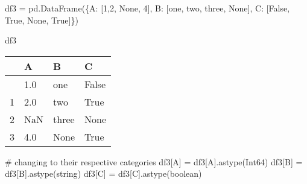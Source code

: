 \documentclass[
  letterpaper,
  DIV=11,
  numbers=noendperiod]{scrreprt}
\newenvironment{Shaded}{\begin{snugshade}}{\end{snugshade}}
\newcommand{\CommentTok}[1]{\textcolor[rgb]{0.37,0.37,0.37}{#1}}
\newcommand{\DecValTok}[1]{\textcolor[rgb]{0.68,0.00,0.00}{#1}}
\newcommand{\NormalTok}[1]{\textcolor[rgb]{0.00,0.23,0.31}{#1}}
\newcommand{\OperatorTok}[1]{\textcolor[rgb]{0.37,0.37,0.37}{#1}}
\newcommand{\StringTok}[1]{\textcolor[rgb]{0.13,0.47,0.30}{#1}}
\newcommand{\VariableTok}[1]{\textcolor[rgb]{0.07,0.07,0.07}{#1}}
\begin{document}
\begin{Shaded}
\begin{Highlighting}[]
\NormalTok{df3 }\OperatorTok{=}\NormalTok{ pd.DataFrame(\{}\StringTok{\textquotesingle{}A\textquotesingle{}}\NormalTok{: [}\DecValTok{1}\NormalTok{,}\DecValTok{2}\NormalTok{, }\VariableTok{None}\NormalTok{, }\DecValTok{4}\NormalTok{],}
                   \StringTok{\textquotesingle{}B\textquotesingle{}}\NormalTok{: [}\StringTok{\textquotesingle{}one\textquotesingle{}}\NormalTok{, }\StringTok{\textquotesingle{}two\textquotesingle{}}\NormalTok{, }\StringTok{\textquotesingle{}three\textquotesingle{}}\NormalTok{, }\VariableTok{None}\NormalTok{],}
                   \StringTok{\textquotesingle{}C\textquotesingle{}}\NormalTok{: [}\VariableTok{False}\NormalTok{, }\VariableTok{True}\NormalTok{, }\VariableTok{None}\NormalTok{, }\VariableTok{True}\NormalTok{]\})}

\NormalTok{df3}
\end{Highlighting}
\end{Shaded}

\begin{longtable}[]{@{}llll@{}}
\toprule\noalign{}
& A & B & C \\
\midrule\noalign{}
\endhead
\bottomrule\noalign{}
\endlastfoot
0 & 1.0 & one & False \\
1 & 2.0 & two & True \\
2 & NaN & three & None \\
3 & 4.0 & None & True \\
\end{longtable}

\begin{Shaded}
\begin{Highlighting}[]
\CommentTok{\# changing to their respective categories}
\NormalTok{df3[}\StringTok{\textquotesingle{}A\textquotesingle{}}\NormalTok{] }\OperatorTok{=}\NormalTok{ df3[}\StringTok{\textquotesingle{}A\textquotesingle{}}\NormalTok{].astype(}\StringTok{\textquotesingle{}Int64\textquotesingle{}}\NormalTok{)}
\NormalTok{df3[}\StringTok{\textquotesingle{}B\textquotesingle{}}\NormalTok{] }\OperatorTok{=}\NormalTok{ df3[}\StringTok{\textquotesingle{}B\textquotesingle{}}\NormalTok{].astype(}\StringTok{\textquotesingle{}string\textquotesingle{}}\NormalTok{)}
\NormalTok{df3[}\StringTok{\textquotesingle{}C\textquotesingle{}}\NormalTok{] }\OperatorTok{=}\NormalTok{ df3[}\StringTok{\textquotesingle{}C\textquotesingle{}}\NormalTok{].astype(}\StringTok{\textquotesingle{}boolean\textquotesingle{}}\NormalTok{)}
\end{Highlighting}
\end{Shaded}
\end{document}
